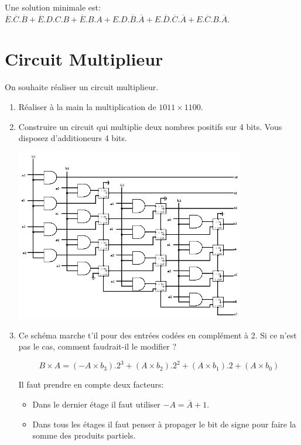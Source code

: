 \documentclass[a4paper,10pt]{exam}
\begin{document}
\begin{enumerate}
\begin{solution}
        Une solution minimale est: $\overline{E}.\overline{C}.\overline{B} +
        \overline{E}.D.C.B + \overline{E}.B.A + E.D.\overline{B}.\overline{A} +
        E.\overline{D}.\overline{C}.\overline{A} + E.\overline{C}.B.\overline{A}$.
      \end{solution}
\end{enumerate}

\section{Circuit Multiplieur}

On souhaite réaliser un circuit multiplieur.
\begin{enumerate}
  \item Réaliser à la main la multiplication de $1011 \times 1100$.
  \item Construire un circuit qui multiplie deux nombres positifs
    sur 4 bits. Vous disposez d'additioneurs 4 bits.
    \begin{solution}
      \includegraphics[width=10cm]{4-mult}
    \end{solution}

  \item Ce schéma marche t'il pour des entrées codées en complément à 2.
    Si ce n'est pas le cas, comment faudrait-il le modifier ?
    \begin{solution}
      $$B \times A = ( -A \times b_3).2^3 + (A \times b_2).2^2 + (A \times
      b_1).2 + (A \times b_0)$$

      Il faut prendre en compte deux facteurs:
      \begin{itemize}
        \item Dans le dernier étage il faut utiliser $-A = \overline{A} + 1$.
        \item Dans tous les étages il faut penser à propager le bit de signe
          pour faire la somme des produits partiels.
      \end{itemize}


\end{solution}
\end{enumerate}
\end{document}
